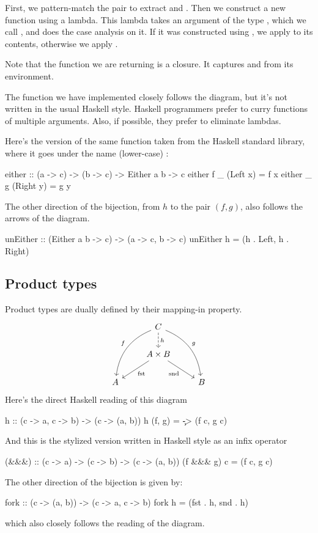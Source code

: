 \documentclass[DaoFP]{subfiles}
\begin{document}
First, we pattern-match the pair  to extract  and . Then we construct a new function using a lambda. This lambda takes an argument of the type , which we call , and does the case analysis on it. If it was constructed using , we apply  to its contents, otherwise we apply . 

Note that the function we are returning is a closure. It captures  and  from its environment. 

The function we have implemented closely follows the diagram, but it's not written in the usual Haskell style. Haskell programmers prefer to curry functions of multiple arguments. Also, if possible, they prefer to eliminate lambdas. 

Here's the version of the same function taken from the Haskell standard library, where it goes under the name (lower-case) :
\begin{haskell}
either                  :: (a -> c) -> (b -> c) -> Either a b -> c
either f _ (Left x)     =  f x
either _ g (Right y)    =  g y
\end{haskell}

The other direction of the bijection, from $h$ to the pair $(f, g)$, also follows the arrows of the diagram.
\begin{haskell}
unEither :: (Either a b -> c) -> (a -> c, b -> c)
unEither h = (h . Left, h . Right)
\end{haskell}


\subsection{Product types}

Product types are dually defined by their mapping-in property.
\[
 \begin{tikzcd}
 & C
\arrow[d, dashed, "h"]
 \arrow[ddl, bend right, "f"']
 \arrow[ddr, bend left, "g"]
\\
&A \times B
 \arrow[dl,  "\text{fst}"]
  \arrow[dr,   "\text{snd}"']
\\
A && B
 \end{tikzcd}
\]
Here's the direct Haskell reading of this diagram
\begin{haskell}
h :: (c -> a, c -> b) -> (c -> (a, b))
h (f, g) = \c -> (f c, g c)
\end{haskell}
And this is the stylized version written in Haskell style as an infix operator \hask{&&&}
\begin{haskell}
(&&&) :: (c -> a) -> (c -> b) -> (c -> (a, b))
(f &&& g) c = (f c, g c)
\end{haskell}
The other direction of the bijection is given by:
\begin{haskell}
fork :: (c -> (a, b)) -> (c -> a, c -> b)
fork h = (fst . h, snd . h)
\end{haskell}
which also closely follows the reading of the diagram.
\end{document}
